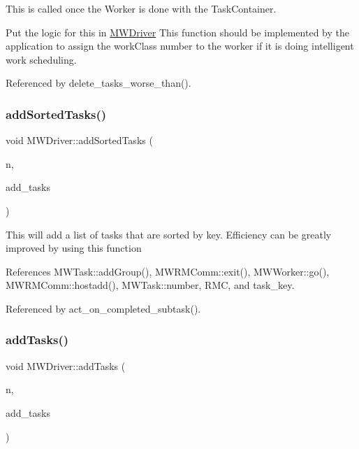 This is called once the Worker is done with the Task\+Container.
\begin{DoxyItemize}
\item Put the logic for this in \hyperlink{classMWDriver}{M\+W\+Driver} This function should be implemented by the application to assign the work\+Class number to the worker if it is doing intelligent work scheduling. 
\end{DoxyItemize}

Referenced by delete\+\_\+tasks\+\_\+worse\+\_\+than().

\mbox{\label{classMWDriver_a0dfb4201b9bce44ba2a59019f7fc2dd2}} 
\subsubsection{\texorpdfstring{add\+Sorted\+Tasks()}{addSortedTasks()}}
{\footnotesize\ttfamily void M\+W\+Driver\+::add\+Sorted\+Tasks (\begin{DoxyParamCaption}\item[{int}]{n,  }\item[{\hyperlink{classMWTask}{M\+W\+Task} $\ast$$\ast$}]{add\+\_\+tasks }\end{DoxyParamCaption})\hspace{0.3cm}{\ttfamily [protected]}}

This will add a list of tasks that are sorted by key. Efficiency can be greatly improved by using this function 

References M\+W\+Task\+::add\+Group(), M\+W\+R\+M\+Comm\+::exit(), M\+W\+Worker\+::go(), M\+W\+R\+M\+Comm\+::hostadd(), M\+W\+Task\+::number, R\+MC, and task\+\_\+key.



Referenced by act\+\_\+on\+\_\+completed\+\_\+subtask().

\mbox{\label{classMWDriver_a8b8a9ff2699780ce52ae600b658c9e4f}} 
\subsubsection{\texorpdfstring{add\+Tasks()}{addTasks()}}
{\footnotesize\ttfamily void M\+W\+Driver\+::add\+Tasks (\begin{DoxyParamCaption}\item[{int}]{n,  }\item[{\hyperlink{classMWTask}{M\+W\+Task} $\ast$$\ast$}]{add\+\_\+tasks }\end{DoxyParamCaption})\hspace{0.3cm}{\ttfamily [protected]}}

